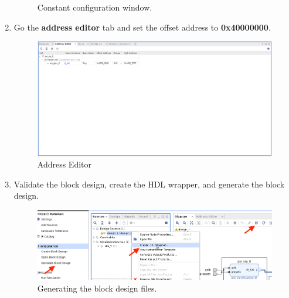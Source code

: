 \documentclass[12pt]{article}
\begin{document}
\begin{enumerate}
\begin{figure}[H]
		  \caption{Constant configuration window.}
		  \label{fig:naxiconstantconfig}
		\end{figure}
	\item Go the \textbf{address editor} tab and set the offset address to \textbf{0x40000000}.
		\begin{figure}[H]
		  \centering
		  \includegraphics[width=\textwidth]{naddresseditor.png}
		  \caption{Address Editor}
		  \label{fig:naddresseditor}
		\end{figure}
	\item Validate the block design, create the HDL wrapper, and generate the block design. 
		\begin{figure}[H]
		  \centering
		  \includegraphics[scale=0.4]{validatebd.png}
		  \caption{Generating the block design files.}
		  \label{fig:validatebd.png}
		\end{figure}
\end{enumerate}
\end{document}
